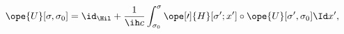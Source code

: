 \begin{equation}	\label{12.53}
\ope{U}[\sigma,\sigma_0]
=
\id_\Hil
+
\frac{1}{\ih c}
\int_{\sigma_0}^\sigma \ope[\prime]{H}[\sigma';x']
					\circ  \ope{U}[\sigma',\sigma_0]
\Id x' ,
	\end{equation}

